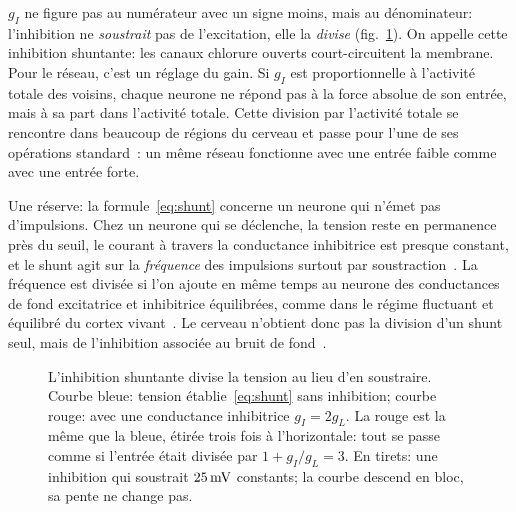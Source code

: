 $g_I$ ne figure pas au numérateur avec un signe moins, mais au dénominateur: l'inhibition ne \emph{soustrait} pas de l'excitation, elle la \emph{divise} (fig.~\ref{fig:shunt}). On appelle cette inhibition shuntante: les canaux chlorure ouverts court-circuitent la membrane. Pour le réseau, c'est un réglage du gain. Si $g_I$ est proportionnelle à l'activité totale des voisins, chaque neurone ne répond pas à la force absolue de son entrée, mais à sa part dans l'activité totale. Cette division par l'activité totale se rencontre dans beaucoup de régions du cerveau et passe pour l'une de ses opérations standard~\cite{Carandini2012}: un même réseau fonctionne avec une entrée faible comme avec une entrée forte.

Une réserve: la formule~\eqref{eq:shunt} concerne un neurone qui n'émet pas d'impulsions. Chez un neurone qui se déclenche, la tension reste en permanence près du seuil, le courant à travers la conductance inhibitrice est presque constant, et le shunt agit sur la \emph{fréquence} des impulsions surtout par soustraction~\cite{HoltKoch1997}. La fréquence est divisée si l'on ajoute en même temps au neurone des conductances de fond excitatrice et inhibitrice équilibrées, comme dans le régime fluctuant et équilibré du cortex vivant~\cite{Chance2002}. Le cerveau n'obtient donc pas la division d'un shunt seul, mais de l'inhibition associée au bruit de fond~\cite{Carandini2012}.

\begin{figure}[t]
\centering
{}
\caption{L'inhibition shuntante divise la tension au lieu d'en soustraire. Courbe bleue: tension établie~\eqref{eq:shunt} sans inhibition; courbe rouge: avec une conductance inhibitrice $g_I=2g_L$. La rouge est la même que la bleue, étirée trois fois à l'horizontale: tout se passe comme si l'entrée était divisée par $1+g_I/g_L=3$. En tirets: une inhibition qui soustrait $25\,\text{mV}$ constants; la courbe descend en bloc, sa pente ne change pas.}
\label{fig:shunt}
\end{figure}

